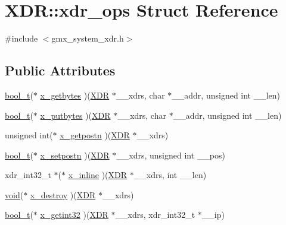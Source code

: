 \hypertarget{structXDR_1_1xdr__ops}{\section{\-X\-D\-R\-:\-:xdr\-\_\-ops \-Struct \-Reference}
\label{structXDR_1_1xdr__ops}
}


{\ttfamily \#include $<$gmx\-\_\-system\-\_\-xdr.\-h$>$}

\subsection*{\-Public \-Attributes}
\begin{DoxyCompactItemize}
\item 
\hyperlink{include_2gmx__system__xdr_8h_a812d16e5494522586b3784e55d479912}{bool\-\_\-t}($\ast$ \hyperlink{structXDR_1_1xdr__ops_a1a420c3b5a54bc2f1acae91536c965fb}{x\-\_\-getbytes} )(\hyperlink{structXDR}{\-X\-D\-R} $\ast$\-\_\-\-\_\-xdrs, char $\ast$\-\_\-\-\_\-addr, unsigned int \-\_\-\-\_\-len)
\item 
\hyperlink{include_2gmx__system__xdr_8h_a812d16e5494522586b3784e55d479912}{bool\-\_\-t}($\ast$ \hyperlink{structXDR_1_1xdr__ops_a7479b63ae6c3f4d177f819145ec98016}{x\-\_\-putbytes} )(\hyperlink{structXDR}{\-X\-D\-R} $\ast$\-\_\-\-\_\-xdrs, char $\ast$\-\_\-\-\_\-addr, unsigned int \-\_\-\-\_\-len)
\item 
unsigned int($\ast$ \hyperlink{structXDR_1_1xdr__ops_aa8ba298e4969165845e4ddb483460f12}{x\-\_\-getpostn} )(\hyperlink{structXDR}{\-X\-D\-R} $\ast$\-\_\-\-\_\-xdrs)
\item 
\hyperlink{include_2gmx__system__xdr_8h_a812d16e5494522586b3784e55d479912}{bool\-\_\-t}($\ast$ \hyperlink{structXDR_1_1xdr__ops_ae605d84932d289b354d0c841b88ab8d8}{x\-\_\-setpostn} )(\hyperlink{structXDR}{\-X\-D\-R} $\ast$\-\_\-\-\_\-xdrs, unsigned int \-\_\-\-\_\-pos)
\item 
xdr\-\_\-int32\-\_\-t $\ast$($\ast$ \hyperlink{structXDR_1_1xdr__ops_a9fc8d173a815e617d0b5679d81892311}{x\-\_\-inline} )(\hyperlink{structXDR}{\-X\-D\-R} $\ast$\-\_\-\-\_\-xdrs, int \-\_\-\-\_\-len)
\item 
\hyperlink{nbnxn__kernel__simd__4xn__outer_8h_a8dc3f4a797ed992dff49d2fa3477eee8}{void}($\ast$ \hyperlink{structXDR_1_1xdr__ops_a798f4f4e8cf97ff6c1513fa4c186891f}{x\-\_\-destroy} )(\hyperlink{structXDR}{\-X\-D\-R} $\ast$\-\_\-\-\_\-xdrs)
\item 
\hyperlink{include_2gmx__system__xdr_8h_a812d16e5494522586b3784e55d479912}{bool\-\_\-t}($\ast$ \hyperlink{structXDR_1_1xdr__ops_a65ab539fa63638deb283b6c3322c1829}{x\-\_\-getint32} )(\hyperlink{structXDR}{\-X\-D\-R} $\ast$\-\_\-\-\_\-xdrs, xdr\-\_\-int32\-\_\-t $\ast$\-\_\-\-\_\-ip)

\end{DoxyCompactItemize}
